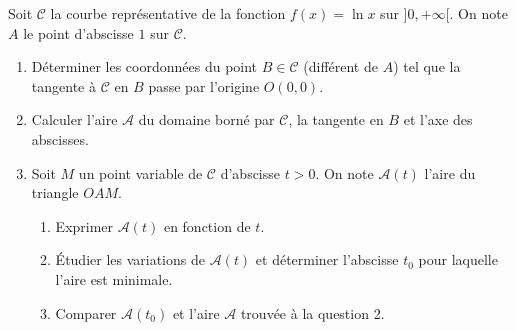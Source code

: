 \documentclass[11pt]{article}
\begin{document}
\begin{exercice}
Soit $\mathcal{C}$ la courbe représentative de la fonction $f(x) = \ln x$ sur $]0, +\infty[$. On note $A$ le point d'abscisse $1$ sur $\mathcal{C}$.
\begin{enumerate}
    \item Déterminer les coordonnées du point $B \in \mathcal{C}$ (différent de $A$) tel que la tangente à $\mathcal{C}$ en $B$ passe par l'origine $O(0,0)$.
    \item Calculer l'aire $\mathcal{A}$ du domaine borné par $\mathcal{C}$, la tangente en $B$ et l'axe des abscisses.
    \item Soit $M$ un point variable de $\mathcal{C}$ d'abscisse $t > 0$. On note $\mathcal{A}(t)$ l'aire du triangle $OAM$.
        \begin{enumerate}
            \item Exprimer $\mathcal{A}(t)$ en fonction de $t$.
            \item Étudier les variations de $\mathcal{A}(t)$ et déterminer l'abscisse $t_0$ pour laquelle l'aire est minimale.
            \item Comparer $\mathcal{A}(t_0)$ et l'aire $\mathcal{A}$ trouvée à la question 2.
        \end{enumerate}
\end{enumerate}
\end{exercice}
\end{document}
